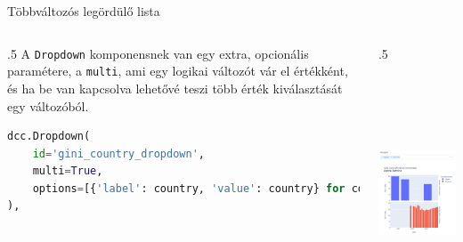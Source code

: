 \documentclass[english, aspectratio=169]{beamer}
\begin{document}
\begin{frame}[fragile]{Többváltozós legördülő lista}
	\begin{columns}
		\begin{column}{.5\textwidth}
			A \texttt{Dropdown} komponensnek van egy extra, opcionális paramétere, a \texttt{multi}, ami egy logikai változót vár el értékként, és ha be van kapcsolva lehetővé teszi több érték kiválasztását egy változóból.\par\medskip
			\begin{lstlisting}[language=python]
dcc.Dropdown(
	id='gini_country_dropdown', 
	multi=True,
	options=[{'label': country, 'value': country} for country in gini_df['Country Name'].unique()]
),				
			\end{lstlisting}
		\end{column}
		\begin{column}{.5\textwidth}
			\begin{center}
				\includegraphics[width=7cm, height=7cm, keepaspectratio]{images/plots_24.png}
			\end{center}			
		\end{column}
	\end{columns}
\end{frame}
\end{document}
